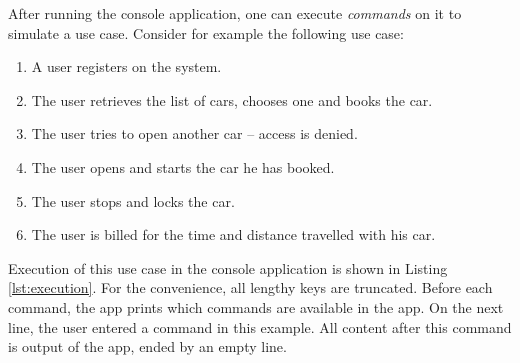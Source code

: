 \documentclass[12pt,a4paper, oneside]{article}
\begin{document}
After running the console application, one can execute \textit{commands} on it to simulate a use case. Consider for example the following use case:
\begin{enumerate}
\item A user registers on the system.
\item The user retrieves the list of cars, chooses one and books the car.
\item The user tries to open another car -- access is denied.
\item The user opens and starts the car he has booked.
\item The user stops and locks the car.
\item The user is billed for the time and distance travelled with his car.
\end{enumerate}
Execution of this use case in the console application is shown in Listing \ref{lst:execution}. For the convenience, all lengthy keys are truncated. Before each command, the app prints which commands are available in the app. On the next line, the user entered a command in this example. All content after this command is output of the app, ended by an empty line.
\end{document}
